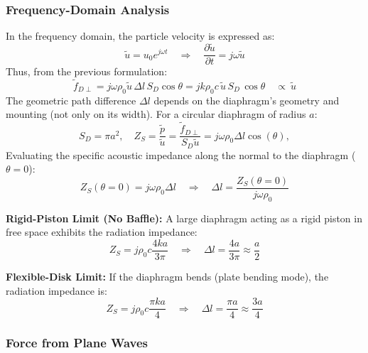 \subsubsection{Frequency-Domain Analysis}

In the frequency domain, the particle velocity is expressed as:
\[
\tilde{u} = u_0 e^{j \omega t} \quad \Rightarrow \quad \frac{\partial \tilde{u}}{\partial t} = j \omega \tilde{u}
\]
Thus, from the previous formulation:
\[
\tilde{f}_{D\perp} = j \omega \rho_0 \tilde{u} \, \Delta l \, S_D \cos \theta = j k \rho_0 c \, \tilde{u} \, S_D \, \cos \theta \quad \propto \ \tilde{u}
\]
The geometric path difference \( \Delta l \) depends on the diaphragm’s geometry and mounting (not only on its width).  
For a circular diaphragm of radius \( a \):
\[
S_D = \pi a^2, 
\quad 
Z_S = \frac{\tilde{p}}{\tilde{u}} = \frac{\tilde{f}_{D\perp}}{S_D \tilde{u}} = j \omega \rho_0 \Delta l \cos (\theta),
\]
Evaluating the specific acoustic impedance along the normal to the diaphragm (\( \theta = 0 \)):
\[
Z_S (\theta = 0) = j \omega \rho_0 \Delta l \quad \Rightarrow \quad \Delta l = \frac{Z_S (\theta = 0)}{j \omega \rho_0}
\]

\textbf{Rigid-Piston Limit (No Baffle): } A large diaphragm acting as a rigid piston in free space exhibits the radiation impedance:
\[
Z_S = j \rho_0 c \frac{4ka}{3\pi}
\quad \Rightarrow \quad
\Delta l = \frac{4a}{3\pi} \approx \frac{a}{2}
\]

\textbf{Flexible-Disk Limit: } If the diaphragm bends (plate bending mode), the radiation impedance is:
\[
Z_S = j \rho_0 c \frac{\pi k a}{4} \quad \Rightarrow \quad \Delta l = \frac{\pi a}{4} \approx \frac{3a}{4}
\]

\subsubsection{Force from Plane Waves}

